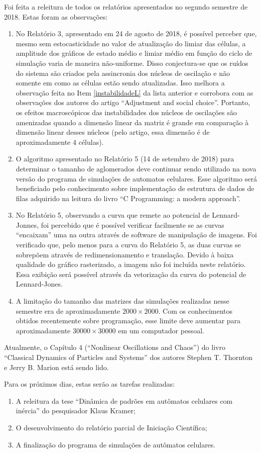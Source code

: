 \documentclass[12pt,a4paper,final]{article}
\begin{document}
  Foi feita a releitura de todos os relatórios apresentados no segundo semestre de 2018. Estas foram as observações:
  \begin{enumerate}
    \item No Relatório 3, apresentado em 24 de agosto de 2018, é possível perceber que, mesmo sem estocasticidade no valor de atualização do limiar das células, a amplitude dos gráficos de estado médio e limiar médio em função do ciclo de simulação varia de maneira não-uniforme. Disso conjectura-se que os ruídos do sistema são criados pela assincronia dos núcleos de oscilação e não somente em como as células estão sendo atualizadas. Isso melhora a observação feita no Item \ref{instabilidadeL} da lista anterior e corrobora com as observações dos autores do artigo ``Adjustment and social choice''. Portanto, os efeitos macroscópicos das instabilidades dos núcleos de oscilações são amenizadas quando a dimensão linear da matriz é grande em comparação à dimensão linear desses núcleos (pelo artigo, essa dimensão é de aproximadamente 4 células).
    \item O algoritmo apresentado no Relatório 5 (14 de setembro de 2018) para determinar o tamanho de aglomerados deve continuar sendo utilizado na nova versão do programa de simulações de automatos celulares. Esse algoritmo será beneficiado pelo conhecimento sobre implementação de estrutura de dados de filas adquirido na leitura do livro ``C Programming: a modern approach''.
    \item No Relatório 5, observando a curva que remete ao potencial de Lennard-Jonnes, foi percebido que é possível verificar facilmente se as curvas ``encaixam'' uma na outra através de software de manipulação de imagens. Foi verificado que, pelo menos para a curva do Relatório 5, as duas curvas se sobrepõem através de redimensionamento e translação. Devido à baixa qualidade do gráfico rasterizado, a imagem não foi incluída neste relatório. Essa exibição será possível através da vetorização da curva do potencial de Lennard-Jones.
    \item A limitação do tamanho das matrizes das simulações realizadas nesse semestre era de aproximadamente $2000\times 2000$. Com os conhecimentos obtidos recentemente sobre programação, esse limite deve aumentar para aproximadamente $30000\times 30000$ em um computador pessoal.
  \end{enumerate}

  Atualmente, o Capítulo 4 (``Nonlinear Oscillations and Chaos'') do livro ``Classical Dynamics of Particles and Systems'' dos autores Stephen T. Thornton e Jerry B. Marion está sendo lido. 
  
  
  Para os próximos dias, estas serão as tarefas realizadas:
	\begin{enumerate}
		\item A releitura da tese ``Dinâmica de padrões em autômatos celulares com inércia'' do pesquisador Klaus Kramer;
		\item O desenvolvimento do relatório parcial de Iniciação Científica;
		\item A finalização do programa de simulações de autômatos celulares.
	\end{enumerate}
\end{document}
